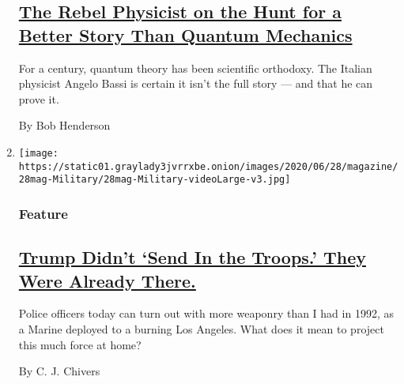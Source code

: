 \begin{enumerate}
{  \subsection{\texorpdfstring{\href{/2020/06/25/magazine/angelo-bassi-quantum-mechanic.html}{The
  Rebel Physicist on the Hunt for a Better Story Than Quantum
  Mechanics}}{The Rebel Physicist on the Hunt for a Better Story Than Quantum Mechanics}}\label{the-rebel-physicist-on-the-hunt-for-a-better-story-than-quantum-mechanics}}

  For a century, quantum theory has been scientific orthodoxy. The
  Italian physicist Angelo Bassi is certain it isn't the full story ---
  and that he can prove it.

  By Bob Henderson
\item
  \texttt{[image: https://static01.graylady3jvrrxbe.onion/images/2020/06/28/magazine/28mag-Military/28mag-Military-videoLarge-v3.jpg]}

  \hypertarget{feature-1}{%
  \subsubsection{Feature}\label{feature-1}}

  \hypertarget{trump-didnt-send-in-the-troops-they-were-already-there}{%
  \subsection{\texorpdfstring{\href{/2020/06/23/magazine/la-riots-1992.html}{Trump
  Didn't `Send In the Troops.' They Were Already
  There.}}{Trump Didn't `Send In the Troops.' They Were Already There.}}\label{trump-didnt-send-in-the-troops-they-were-already-there}}

  Police officers today can turn out with more weaponry than I had in
  1992, as a Marine deployed to a burning Los Angeles. What does it mean
  to project this much force at home?

  By C. J. Chivers
\end{enumerate}


